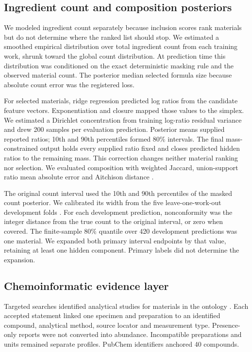 \documentclass[12pt]{article}
\begin{document}
\subsection*{Ingredient count and composition posteriors}

We modeled ingredient count separately because inclusion scores rank materials but do not determine where the ranked list should stop. We estimated a smoothed empirical distribution over total ingredient count from each training work, shrunk toward the global count distribution. At prediction time this distribution was conditioned on the exact deterministic masking rule and the observed material count. The posterior median selected formula size because absolute count error was the registered loss.

For selected materials, ridge regression predicted log ratios from the candidate feature vectors. Exponentiation and closure mapped those values to the simplex. We estimated a Dirichlet concentration from training log-ratio residual variance and drew 200 samples per evaluation prediction. Posterior means supplied reported ratios; 10th and 90th percentiles formed 80\% intervals. The final mass-constrained output holds every supplied ratio fixed and closes predicted hidden ratios to the remaining mass. This correction changes neither material ranking nor selection. We evaluated composition with weighted Jaccard, union-support ratio mean absolute error and Aitchison distance \cite{ref19}.

The original count interval used the 10th and 90th percentiles of the masked count posterior. We calibrated its width from the five leave-one-work-out development folds \cite{ref18}. For each development prediction, nonconformity was the integer distance from the true count to the original interval, or zero when covered. The finite-sample 80\% quantile over 420 development predictions was one material. We expanded both primary interval endpoints by that value, retaining at least one hidden component. Primary labels did not determine the expansion.

\subsection*{Chemoinformatic evidence layer}

Targeted searches identified analytical studies for materials in the ontology \cite{ref22,ref23,ref24,ref25,ref26,ref27,ref28,ref29,ref30,ref31,ref32,ref33,ref34,ref35,ref36,ref37,ref38}. Each accepted statement linked one specimen and preparation to an identified compound, analytical method, source locator and measurement type. Presence-only reports were not converted into abundance. Incompatible preparations and units remained separate profiles. PubChem identifiers anchored 40 compounds.
\end{document}
